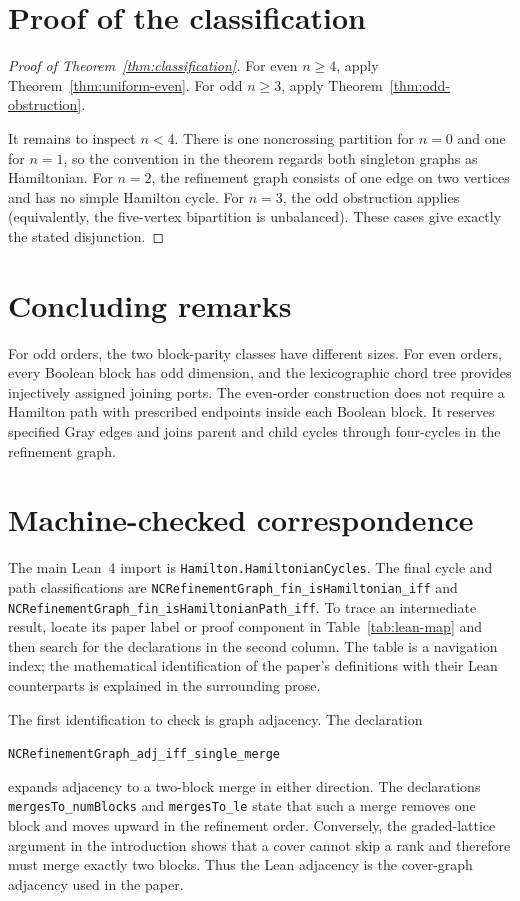 \documentclass[12pt]{article}
\newcommand{\leanname}[1]{\nolinkurl{#1}}
\begin{document}
\section{Proof of the classification}

\begin{proof}[Proof of Theorem~\ref{thm:classification}]
For even $n\geq4$, apply Theorem~\ref{thm:uniform-even}.  For odd
$n\geq3$, apply Theorem~\ref{thm:odd-obstruction}.

It remains to inspect $n<4$.  There is one noncrossing partition for $n=0$
and one for $n=1$, so the convention in the theorem regards both singleton
graphs as Hamiltonian.  For $n=2$, the refinement graph consists of one edge
on two vertices and has no simple Hamilton cycle.  For $n=3$, the odd
obstruction applies (equivalently, the five-vertex bipartition is unbalanced).
These cases give exactly the stated disjunction.
\end{proof}

\section{Concluding remarks}

For odd orders, the two block-parity classes have different sizes.  For even
orders, every Boolean block has odd dimension, and the lexicographic chord
tree provides injectively assigned joining ports.  The even-order construction
does not require a Hamilton path with prescribed endpoints inside each
Boolean block.  It reserves specified Gray edges and joins parent and child
cycles through four-cycles in the refinement graph.

\section{Machine-checked correspondence}\label{sec:formal}

The main Lean~4 import is \texttt{Hamilton.HamiltonianCycles}.  The final
cycle and path classifications are
\leanname{NCRefinementGraph_fin_isHamiltonian_iff} and
\leanname{NCRefinementGraph_fin_isHamiltonianPath_iff}.  To trace an
intermediate result, locate its paper label or proof component in
Table~\ref{tab:lean-map} and then search for the declarations in the second
column.  The table is a navigation index; the mathematical identification of
the paper's definitions with their Lean counterparts is explained in the
surrounding prose.

The first identification to check is graph adjacency.  The declaration
\begin{center}
\leanname{NCRefinementGraph_adj_iff_single_merge}
\end{center}
expands adjacency to a two-block merge in either direction.
The declarations \leanname{mergesTo_numBlocks} and \leanname{mergesTo_le}
state that such a merge removes one block and moves upward in the refinement
order.  Conversely, the graded-lattice argument in the introduction shows
that a cover cannot skip a rank and therefore must merge exactly two blocks.
Thus the Lean adjacency is the cover-graph adjacency used in the paper.
\end{document}
